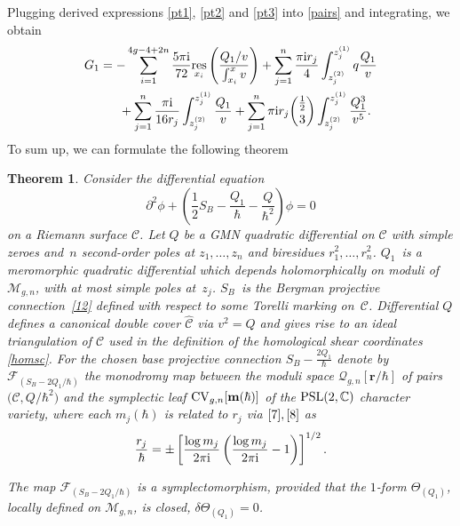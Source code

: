 \documentclass[pdftex]{sigma}
\numberwithin{equation}{section}
\newtheorem{Theorem}{Theorem}[section]
\theoremstyle{definition}
\newcommand{\CC}{\mathbb{C}}
\begin{document}
Plugging derived expressions \eqref{pt1}, \eqref{pt2} and \eqref{pt3} into \eqref{pairs} and integrating, we obtain
\begin{gather}G_{1}=-\sum^{4g-4+2n}_{i=1} \frac{5 \pi{\rm i}}{72}\underset{x_i}{\rm res}\left(\frac{Q_1/v}{\int^x_{x_i}v} \right)+\sum^{n}_{j=1}\frac{\pi{\rm i} r_j }{4}\int^{z^{(1)}_j}_{z^{(2)}_j} q\frac{Q_1}{v} \nonumber\\
\hphantom{G_{1}=}{}
+\sum^{n}_{j=1}\frac{\pi{\rm i}}{16{r}_j}\int^{{z}^{(1)}_j}_{{z}^{(2)}_j}\frac{Q_1}{v}+\sum^n_{j=1}\pi{\rm i} r_j\binom{\frac{1}{2}}{3}
 \int^{z^{(1)}_j}_{z^{(2)}_j}\frac{Q^3_1}{v^{5}}.\label{trm1}
 \end{gather}
To sum up, we can formulate the following theorem
\begin{Theorem}
Consider the differential equation
\begin{equation*}
\partial^2\phi+\left(\frac{1}{2}S_B-\frac{Q_1}{\hbar}-\frac{Q}{\hbar^2}\right)\phi=0
\end{equation*}
on a Riemann surface $\mathcal{C}$. Let $Q$ be a GMN quadratic differential on $\mathcal{C}$ with simple zeroes and~$n$ second-order poles at $z_1,\dots, z_n$ and biresidues $r^2_1,\dots,r^2_n$. $Q_1$~is a meromorphic quadratic differential which depends holomorphically on moduli of $\mathcal{M}_{g,n}$, with at most simple poles at~$z_j$. $S_B$~is the Bergman projective connection~\eqref{12} defined with respect to some Torelli marking on~$\mathcal{C}$. Differential $Q$ defines a canonical double cover $\hat{\mathcal{C}}$ via $v^2=Q$ and gives rise to an ideal triangulation of $\mathcal{C}$ used in the definition of the homological shear coordinates \eqref{homsc}. For the chosen base projective connection $S_B-\frac{2Q_1}{\hbar}$ denote by $\mathcal{F}_{(S_B-2Q_1/\hbar)}$ the monodromy map between the moduli space $\mathcal{Q}_{g,n}[\mathbf{r}/\hbar]$ of pairs $\big(\mathcal{C}, Q/\hbar^2\big)$ and the symplectic leaf ${\rm CV}_{g,n}[\mathbf{m}(\hbar)]$ of the ${\rm PSL}(2, \CC)$ character variety, where each $m_j(\hbar)$ is related to $r_j$ via $\eqref{7}, \eqref{8}$ as
\begin{equation*}
\frac{r_j}{\hbar}=\pm \left[\frac{\log m_j}{2 \pi{\rm i} } \left(\frac{\log m_j}{2 \pi{\rm i} }-1 \right)\right]^{1/2}.
\end{equation*}

The map $\mathcal{F}_{(S_B-2Q_1/\hbar)}$ is a symplectomorphism, provided that the $1$-form $\Theta_{(Q_1)}$, locally defined on $\mathcal{M}_{g,n}$, is closed, $\delta\Theta_{(Q_1)}=0$.


\end{Theorem}
\end{document}

